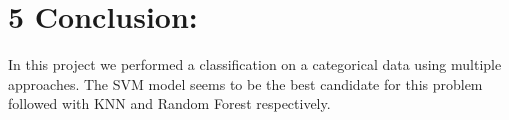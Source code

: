 \documentclass[]{article}
\begin{document}
\section{5 Conclusion:}\label{conclusion-1}

In this project we performed a classification on a categorical data
using multiple approaches. The SVM model seems to be the best candidate
for this problem followed with KNN and Random Forest respectively.
\end{document}
